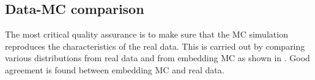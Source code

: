 \subsection{Data-MC comparison}
The most critical quality assurance is to make sure that the MC simulation reproduces the characteristics of the real data. This
is carried out by comparing various distributions from real data and from embedding
MC as shown in . Good agreement is found between embedding MC and real
data.
\begin{figure}[H]
	\centering
	\parbox{0.484\textwidth}{
		\centering
		\begin{subfigure}[b]{\linewidth}{
				}
		\end{subfigure}
	}
	\quad
	\parbox{0.484\textwidth}{
		\centering
		\begin{subfigure}[b]{\linewidth}{
				}

\end{subfigure}}
\end{figure}
